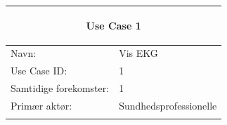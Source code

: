 \begin{table}[H] %
    \begin{tabularx}{\textwidth}{l X}
    \toprule 
    \multicolumn{2}{c}{\begin{large}\textbf{Use Case 1}\end{large}}
 \\ \midrule \addlinespace[1mm]                                                                                                                                                        
     Navn:                  &  Vis EKG \\ \addlinespace[1mm]                                                                                                                                                       
     Use Case ID:           & 1                                                                                                                                                                                                                                                                                                                                                                                                                                                                                                                                                                                                                         \\ \addlinespace[1mm]                                                                                                                                                       
     Samtidige forekomster: & 1                                                                                                                                                                                                                                                                                                                                                                                                                                                                                                                                                                                                                         \\ \addlinespace[1mm]                                                                                                                                                       
     Primær aktør:          &	Sundhedsprofessionelle                                                                                                                                                                                                                                                                                                                                                                                                                                                                                                                                                                                                                 \\ \addlinespace[1mm] 

\end{tabularx}
\end{table}
